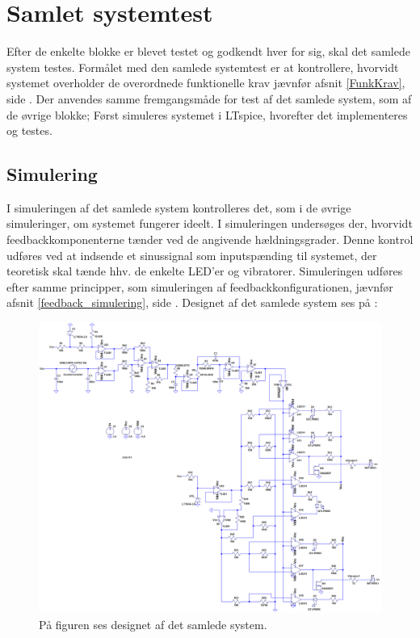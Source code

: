 \section{Samlet systemtest}
Efter de enkelte blokke er blevet testet og godkendt hver for sig, skal det samlede system testes. Formålet med den samlede systemtest er at kontrollere, hvorvidt systemet overholder de overordnede funktionelle krav jævnfør afsnit \ref{FunkKrav}, side \pageref{FunkKrav}. Der anvendes samme fremgangsmåde for test af det samlede system, som af de øvrige blokke; Først simuleres systemet i LTspice, hvorefter det implementeres og testes.

\subsection{Simulering}
I simuleringen af det samlede system kontrolleres det, som i de øvrige simuleringer, om systemet fungerer ideelt. I simuleringen undersøges der, hvorvidt feedbackkomponenterne tænder ved de angivende hældningsgrader. Denne kontrol udføres ved at indsende et sinussignal som inputspænding til systemet, der teoretisk skal tænde hhv. de enkelte LED'er og vibratorer. Simuleringen udføres efter samme principper, som simuleringen af feedbackkonfigurationen, jævnfør afsnit \ref{feedback_simulering}, side \pageref{feedback_simulering}. Designet af det samlede system ses på :
\begin{figure}[H]
	\centering
	\includegraphics[scale=.38]{figures/cProblemloesning/Samlet_systemUL.PNG}
	\caption{På figuren ses designet af det samlede system.}
	\label{fig:samlet_system}
\end{figure}
